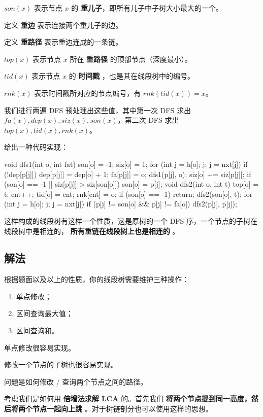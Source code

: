 $son(x)$ 表示节点 $x$ 的 \textbf{重儿子}，即所有儿子中子树大小最大的一个。

定义 \textbf{重边} 表示连接两个重儿子的边。

定义 \textbf{重路径} 表示重边连成的一条链。

$top(x)$ 表示节点 $x$ 所在 \textbf{重路径} 的顶部节点（深度最小）。

$tid(x)$ 表示节点 $x$ 的 \textbf{时间戳} ，也是其在线段树中的编号。

$rnk(x)$ 表示时间戳所对应的节点编号，有 $rnk(tid(x))=x$。

我们进行两遍 DFS 预处理出这些值，其中第一次 DFS 求出 $fa(x),dep(x),siz(x),son(x)$，第二次 DFS 求出 $top(x),tid(x),rnk(x)$。

给出一种代码实现：

\begin{cppcode}
void dfs1(int o, int fat) {
  son[o] = -1;
  siz[o] = 1;
  for (int j = h[o]; j; j = nxt[j])
    if (!dep[p[j]]) {
      dep[p[j]] = dep[o] + 1;
      fa[p[j]] = o;
      dfs1(p[j], o);
      siz[o] += siz[p[j]];
      if (son[o] == -1 || siz[p[j]] > siz[son[o]]) son[o] = p[j];
    }
}
void dfs2(int o, int t) {
  top[o] = t;
  cnt++;
  tid[o] = cnt;
  rnk[cnt] = o;
  if (son[o] == -1) return;
  dfs2(son[o], t);
  for (int j = h[o]; j; j = nxt[j])
    if (p[j] != son[o] && p[j] != fa[o]) dfs2(p[j], p[j]);
}
\end{cppcode}

这样构成的线段树有这样一个性质，这是原树的一个 DFS 序，一个节点的子树在线段树中是相连的， \textbf{所有重链在线段树上也是相连的} 。

\subsection{解法}

根据题面以及以上的性质，你的线段树需要维护三种操作：

\begin{enumerate}
\item 单点修改；
\item 区间查询最大值；
\item 区间查询和。
\end{enumerate}

单点修改很容易实现。

修改一个节点的子树也很容易实现。

问题是如何修改 / 查询两个节点之间的路径。

考虑我们是如何用 \textbf{倍增法求解 LCA} 的。首先我们 \textbf{将两个节点提到同一高度，然后将两个节点一起向上跳} 。对于树链剖分也可以使用这样的思想。

